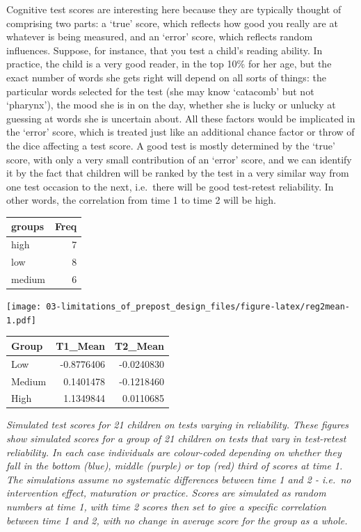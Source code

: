 \documentclass[]{book}
\begin{document}
Cognitive test scores are interesting here because they are typically thought of comprising two parts: a `true' score, which reflects how good you really are at whatever is being measured, and an `error' score, which reflects random influences. Suppose, for instance, that you test a child's reading ability. In practice, the child is a very good reader, in the top 10\% for her age, but the exact number of words she gets right will depend on all sorts of things: the particular words selected for the test (she may know `catacomb' but not `pharynx'), the mood she is in on the day, whether she is lucky or unlucky at guessing at words she is uncertain about. All these factors would be implicated in the `error' score, which is treated just like an additional chance factor or throw of the dice affecting a test score. A good test is mostly determined by the `true' score, with only a very small contribution of an `error' score, and we can identify it by the fact that children will be ranked by the test in a very similar way from one test occasion to the next, i.e.~there will be good test-retest reliability. In other words, the correlation from time 1 to time 2 will be high.

\begin{tabular}{l|r}
\hline
groups & Freq\\
\hline
high & 7\\
\hline
low & 8\\
\hline
medium & 6\\
\hline
\end{tabular}

\texttt{[image: 03-limitations\_of\_prepost\_design\_files/figure-latex/reg2mean-1.pdf]}

\begin{tabular}{l|r|r}
\hline
Group & T1\_Mean & T2\_Mean\\
\hline
Low & -0.8776406 & -0.0240830\\
\hline
Medium & 0.1401478 & -0.1218460\\
\hline
High & 1.1349844 & 0.0110685\\
\hline
\end{tabular}

\emph{Simulated test scores for 21 children on tests varying in reliability. These figures show simulated scores for a group of 21 children on tests that vary in test-retest reliability. In each case individuals are colour-coded depending on whether they fall in the bottom (blue), middle (purple) or top (red) third of scores at time 1. The simulations assume no systematic differences between time 1 and 2 - i.e.~no intervention effect, maturation or practice. Scores are simulated as random numbers at time 1, with time 2 scores then set to give a specific correlation between time 1 and 2, with no change in average score for the group as a whole.}
\end{document}
